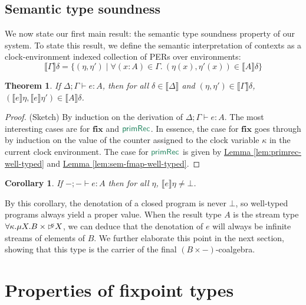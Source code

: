 \documentclass[natbib]{sigplanconf}
\newcommand{\elim}[1]{\textcolor{elim}{\textsf{#1}}}
\newcommand{\kw}[1]{\textbf{#1}}
\newcommand{\ident}[1]{\textit{#1}}
\newcommand{\sem}[1]{\llbracket #1 \rrbracket}
\newcommand{\delay}[1]{\mathord{\rhd\kern-0.4em^{#1}}}
\newtheorem{theorem}{Theorem}
\newtheorem{corollary}{Corollary}
\newcommand{\lemref}[1]{\hyperref[#1]{Lemma \ref*{#1}}}
\begin{document}
\subsection{Semantic type soundness}
\label{sec:semantic-soundness}

We now state our first main result: the semantic type soundness
property of our system. To state this result, we define the semantic
interpretation of contexts as a clock-environment indexed collection
of PERs over environments:
\begin{displaymath}
  \sem{\Gamma}\delta = \{(\eta, \eta') \mathrel| \forall (\ident{x} : A) \in \Gamma.\ (\eta(\ident{x}), \eta'(\ident{x})) \in \sem{A}\delta \}
\end{displaymath}

\begin{theorem}\label{thm:semantic-soundness}
  If $\Delta; \Gamma \vdash e : A$, then for all $\delta \in
  \sem{\Delta}$ and $(\eta,\eta') \in \sem{\Gamma}\delta$,
  $(\sem{e}\eta,\sem{e}\eta') \in \sem{A}\delta$.
\end{theorem}

\begin{proof}
  (Sketch) By induction on the derivation of $\Delta; \Gamma \vdash e
  : A$. The most interesting cases are for $\kw{fix}$ and
  $\elim{primRec}$. In essence, the case for $\kw{fix}$ goes through
  by induction on the value of the counter assigned to the clock
  variable $\kappa$ in the current clock environment. The case for
  $\elim{primRec}$ is given by \lemref{lem:primrec-well-typed} and
  \lemref{lem:sem-fmap-well-typed}.
\end{proof}

\begin{corollary}
  If $-; - \vdash e : A$ then for all $\eta$, $\sem{e}\eta \not=
  \bot$.
\end{corollary}
By this corollary, the denotation of a closed program is never $\bot$,
so well-typed programs always yield a proper value.  When the result
type $A$ is the stream type $\forall \kappa. \mu X. B \times
\delay\kappa X$, we can deduce that the denotation of $e$ will always
be infinite streams of elements of $B$. We further elaborate this
point in the next section, showing that this type is the carrier of
the final $(B \times -)$-coalgebra.

\section{Properties of fixpoint types}
\label{sec:fixpoint-types}
\end{document}
